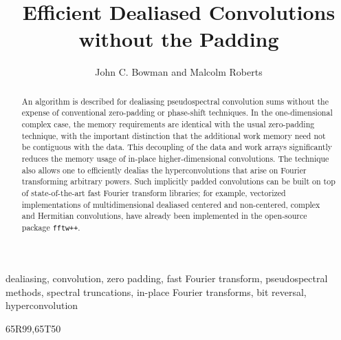 \documentclass[final]{siamltex}
\begin{document}
\title{Efficient Dealiased Convolutions without the Padding}
\author{John C. Bowman and Malcolm Roberts}
\maketitle

\begin{abstract}
An algorithm is described for dealiasing pseudospectral convolution sums
without the expense of conventional zero-padding or phase-shift
techniques. In the one-dimensional complex case, the memory requirements
are identical with the usual zero-padding technique, with the important
distinction that the additional work memory need not be contiguous with the
data. This decoupling of the data and work arrays significantly reduces the
memory usage of in-place higher-dimensional convolutions.
The technique also allows one to efficiently dealias the
hyperconvolutions that arise on Fourier transforming arbitrary powers.
Such implicitly padded convolutions can be built on top of state-of-the-art fast
Fourier transform libraries; for example, vectorized implementations of
multidimensional dealiased centered and non-centered, complex and Hermitian
convolutions, have already been implemented in the open-source package 
{\tt fftw++}. \end{abstract} 

\begin{keywords} 
dealiasing, convolution, zero padding, fast Fourier transform,
pseudospectral methods, spectral truncations, in-place Fourier transforms,
bit reversal, hyperconvolution
\end{keywords}

\begin{AMS}
65R99,65T50
\end{AMS}

\pagestyle{myheadings}


% 




%
\end{document}
